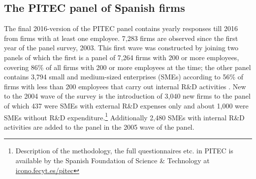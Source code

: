 \label{sec:data}
\subsection{The PITEC panel of Spanish firms}
\label{subsec:pitec}
The final 2016-version of the PITEC panel contains yearly responses till 2016 from firms with at least one employee. 7,283 firms are observed since the first year of the panel survey, 2003. This first wave was constructed by joining two panels of which the first is a panel of 7,264 firms with 200 or more employees, covering 86\% of all firms with 200 or more employees at the time; the other panel contains 3,794 small and medium-sized enterprises (SMEs) according to 56\% of firms with less than 200 employees that carry out internal R\&D activities \citep{vega2009does}. New to the 2004 wave of the survey is the introduction of 3,040 new firms to the panel of which 437 were SMEs with external R\&D expenses only and about 1,000 were SMEs without R\&D expenditure.\footnote{Description of the methodology, the full questionnaires etc. in PITEC is available by the Spanish Foundation of Science \& Technology at \href{https://icono.fecyt.es/pitec}{icono.fecyt.es/pitec}} Additionally 2,480 SMEs with internal R\&D activities are added to the panel in the 2005 wave of the panel.

